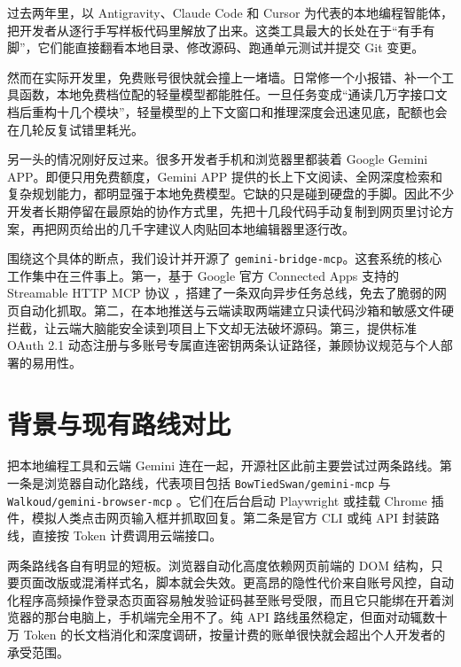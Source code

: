 \documentclass[10pt,a4paper,twocolumn]{article}
\begin{document}
过去两年里，以 Antigravity、Claude Code 和 Cursor 为代表的本地编程智能体，把开发者从逐行手写样板代码里解放了出来。这类工具最大的长处在于“有手有脚”，它们能直接翻看本地目录、修改源码、跑通单元测试并提交 Git 变更。

然而在实际开发里，免费账号很快就会撞上一堵墙。日常修一个小报错、补一个工具函数，本地免费档位配的轻量模型都能胜任。一旦任务变成“通读几万字接口文档后重构十几个模块”，轻量模型的上下文窗口和推理深度会迅速见底，配额也会在几轮反复试错里耗光。

另一头的情况刚好反过来。很多开发者手机和浏览器里都装着 Google Gemini APP。即便只用免费额度，Gemini APP 提供的长上下文阅读、全网深度检索和复杂规划能力，都明显强于本地免费模型。它缺的只是碰到硬盘的手脚。因此不少开发者长期停留在最原始的协作方式里，先把十几段代码手动复制到网页里讨论方案，再把网页给出的几千字建议人肉贴回本地编辑器里逐行改。

围绕这个具体的断点，我们设计并开源了 \texttt{gemini-bridge-mcp}。这套系统的核心工作集中在三件事上。第一，基于 Google 官方 Connected Apps 支持的 Streamable HTTP MCP 协议 \cite{mcp2025}，搭建了一条双向异步任务总线，免去了脆弱的网页自动化抓取。第二，在本地推送与云端读取两端建立只读代码沙箱和敏感文件硬拦截，让云端大脑能安全读到项目上下文却无法破坏源码。第三，提供标准 OAuth 2.1 动态注册与多账号专属直连密钥两条认证路径，兼顾协议规范与个人部署的易用性。

\section{背景与现有路线对比}

把本地编程工具和云端 Gemini 连在一起，开源社区此前主要尝试过两条路线。第一条是浏览器自动化路线，代表项目包括 \texttt{BowTiedSwan/gemini-mcp} \cite{bowtied2025} 与 \texttt{Walkoud/gemini-browser-mcp} \cite{walkoud2025}。它们在后台启动 Playwright 或挂载 Chrome 插件，模拟人类点击网页输入框并抓取回复。第二条是官方 CLI 或纯 API 封装路线，直接按 Token 计费调用云端接口。

两条路线各自有明显的短板。浏览器自动化高度依赖网页前端的 DOM 结构，只要页面改版或混淆样式名，脚本就会失效。更高昂的隐性代价来自账号风控，自动化程序高频操作登录态页面容易触发验证码甚至账号受限，而且它只能绑在开着浏览器的那台电脑上，手机端完全用不了。纯 API 路线虽然稳定，但面对动辄数十万 Token 的长文档消化和深度调研，按量计费的账单很快就会超出个人开发者的承受范围。
\end{document}
